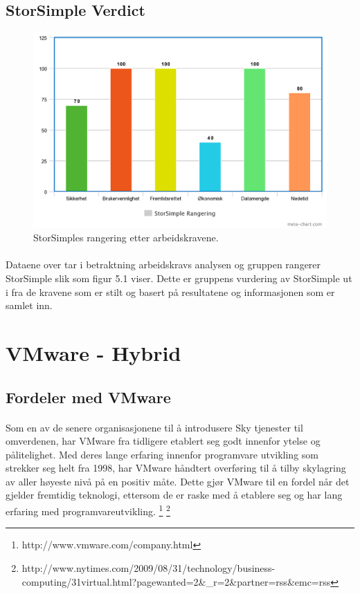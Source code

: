 \subsection{StorSimple Verdict} 
\begin{figure}[H]
\centering
\includegraphics[width=6.5in]{Bilder/chart.png}
\caption{StorSimples rangering etter arbeidskravene.}
\end{figure}

\paragraph{} Dataene over tar i betraktning arbeidskravs analysen og gruppen rangerer StorSimple slik som figur 5.1 viser. Dette er gruppens vurdering av StorSimple ut i fra de kravene som er stilt og basert på resultatene og informasjonen som er samlet inn.

\section{VMware - Hybrid} 
\subsection{Fordeler med VMware}
\paragraph{} Som en av de senere organisasjonene til å introdusere Sky tjenester til omverdenen, har VMware fra tidligere etablert seg godt innenfor ytelse og pålitelighet. Med deres lange erfaring innenfor programvare utvikling som strekker seg helt fra 1998, har VMware håndtert overføring til å tilby skylagring av aller høyeste nivå på en positiv måte. Dette gjør VMware til en fordel når det gjelder fremtidig teknologi, ettersom de er raske med å etablere seg og har lang erfaring med programvareutvikling. 
\footnote{http://www.vmware.com/company.html}
\footnote{http://www.nytimes.com/2009/08/31/technology/business-computing/31virtual.html?pagewanted=2\&\_r=2\&partner=rss\&emc=rss}

